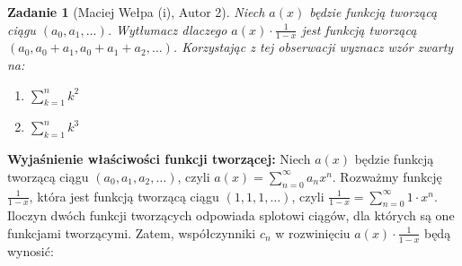 \documentclass{mwart}
\newtheorem{zad}{Zadanie}[section]
\begin{document}
\begin{zad}[Maciej Wełpa (i), Autor 2]
    Niech $a(x)$ będzie funkcją tworzącą ciągu $(a_0,a_1,\dots)$. Wytłumacz dlaczego $a(x) \cdot \frac{1}{1-x}$ jest funkcją tworzącą $(a_0,a_0+a_1,a_0+a_1+a_2,\dots)$. Korzystając z tej obserwacji wyznacz wzór zwarty na:
    \begin{enumerate}
        \item $\sum_{k=1}^{n} k^2$
        \item $\sum_{k=1}^{n} k^3$
    \end{enumerate}
\end{zad}
\begin{mdframed}
    \textbf{Wyjaśnienie właściwości funkcji tworzącej:} \newline
    Niech $a(x)$ będzie funkcją tworzącą ciągu $(a_0, a_1, a_2, \ldots)$, czyli $a(x) = \sum_{n=0}^{\infty} a_n x^n$.
    Rozważmy funkcję $\frac{1}{1-x}$, która jest funkcją tworzącą ciągu $(1, 1, 1, \ldots)$, czyli $\frac{1}{1-x} = \sum_{n=0}^{\infty} 1 \cdot x^n$.
    Iloczyn dwóch funkcji tworzących odpowiada splotowi ciągów, dla których są one funkcjami tworzącymi.
    Zatem, współczynniki $c_n$ w rozwinięciu $a(x) \cdot \frac{1}{1-x}$ będą wynosić:


\end{mdframed}
\end{document}
